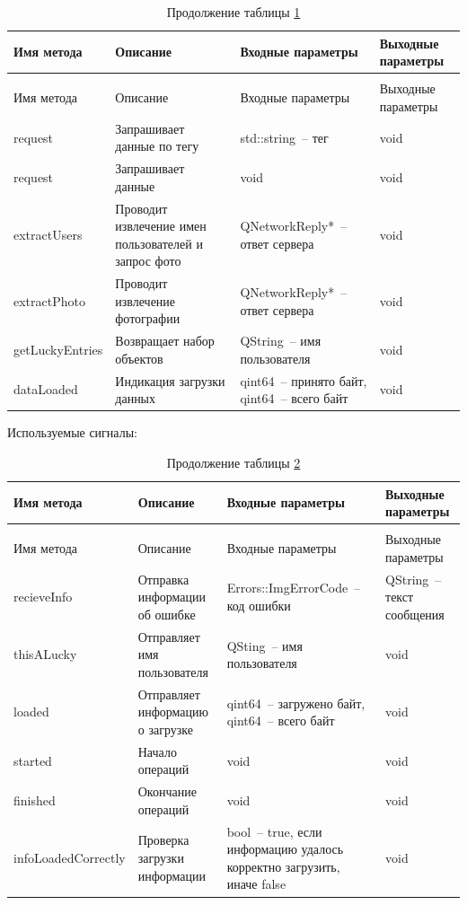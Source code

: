 \documentclass[a4paper,14pt,russian]{extreport}
\begin{document}
\begin{longtable}{|m{3 cm}|m{3 cm}|m{4 cm}|m{4 cm}|}
\caption{Слоты класса YandexImageConnector\label{tab:yandeximageconnectorsl}} \\
\hline 
Имя метода & Описание & Входные параметры & Выходные параметры \\
\hline
\endfirsthead
\caption*{Продолжение таблицы \ref{tab:yandeximageconnectorsl}} \\
\hline
Имя метода & Описание & Входные параметры & Выходные параметры \\
\endhead
request & Запрашивает данные по тегу & std::string~-- тег & void \\
\hline
request & Запрашивает данные & void & void \\
\hline
{extract\-Users} & Проводит извлечение имен пользователей и запрос фото & {QNetwork\-Reply*}~-- ответ сервера & void \\
\hline
{extract\-Photo} & Проводит извлечение фотографии & {QNetwork\-Reply*}~-- ответ сервера & void \\
\hline
{get\-Lucky\-Entries} & Возвращает набор объектов & QString~-- имя пользователя & void \\
\hline
{data\-Loaded} & Индикация загрузки данных & qint64~-- принято байт, qint64~-- всего байт & void \\
\hline
\end{longtable}

Используемые сигналы:

\begin{longtable}{|m{3 cm}|m{3 cm}|m{4 cm}|m{4 cm}|}
\caption{Сигналы класса YandexImageConnector\label{tab:yandeximageconnectorsig}} \\
\hline 
Имя метода & Описание & Входные параметры & Выходные параметры \\
\hline
\endfirsthead
\caption*{Продолжение таблицы \ref{tab:yandeximageconnectorsig}} \\
\hline
Имя метода & Описание & Входные параметры & Выходные параметры \\
\endhead
{recieve\-Info} & Отправка информации об ошибке & {Errors::Img\-Error\-Code}~-- код ошибки & QString~-- текст сообщения \\
\hline
{thisA\-Lucky} & Отправляет имя пользователя & QSting~-- имя пользователя & void \\
\hline
loaded & Отправляет информацию о загрузке & qint64~-- загружено байт, qint64~-- всего байт & void \\
\hline
started & Начало операций & void & void \\
\hline
finished & Окончание операций & void & void \\
\hline
{info\-Loaded\-Correctly} & Проверка загрузки информации & bool~-- true, если информацию удалось корректно загрузить, иначе false & void \\
\hline
\end{longtable}
\end{document}
